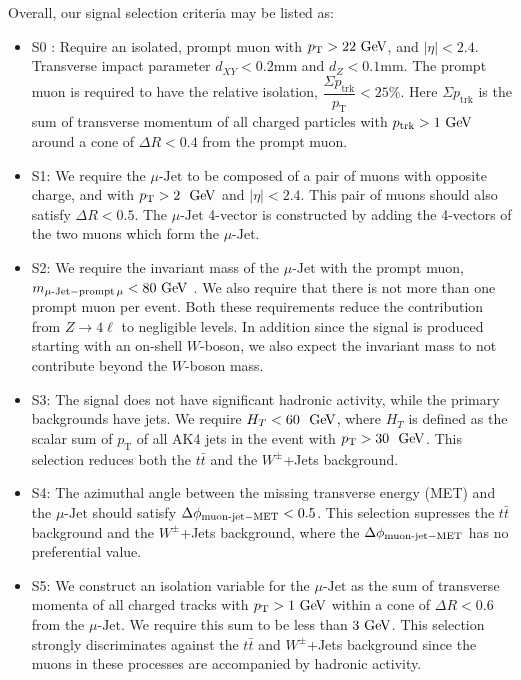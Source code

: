 \documentclass[reprint,doublecolumn,secnumarabic,amssymb, amsmath, aps,nofootinbib,superscriptaddress]{revtex4-1}
\def\GeV{\ifmmode {\mathrm{\ Ge\kern -0.1em V}}\else
                   \textrm{Ge\kern -0.1em V}\fi}%
\newcommand{\pt}      {\ensuremath{p_{\mathrm{T}}}}
\def\abseta{\ensuremath{|\eta|}}
\newcommand{\ttbar}{\ensuremath{t\bar{t}}}
\begin{document}
Overall, our signal selection criteria may be listed as:
\begin{itemize}
\item S0 : Require an isolated, prompt muon with $\pt> 22\GeV$, and $\abseta < 2.4$. Transverse impact parameter $d_{XY} < 0.2$mm and $d_{Z} < 0.1$mm.
The prompt muon is required to have the relative isolation, $\dfrac{\Sigma p_{\mathrm{trk}}}{\pt} < 25\%$. Here $\Sigma p_{\mathrm{trk}}$ is the sum of transverse momentum of all charged particles with $p_{\mathrm{trk}}> 1\GeV$ around a cone of $\Delta R < 0.4$ from the prompt muon.

\item S1: We require the $\mu\text{-Jet}$ to be composed of a pair of muons with opposite charge, and with $\pt>2~\GeV$ and $\abseta<2.4$. This pair of muons should also satisfy $\Delta R < 0.5$. The $\mu\text{-Jet}$ 4-vector is constructed by adding the 4-vectors of the two muons which form the $\mu\text{-Jet}$.
\item S2: We require the invariant mass of the $\mu\text{-Jet}$ with the prompt muon, $m_{\mu\text{-Jet}-\rm{prompt\,}\mu } < 80 \GeV$ . We also require that there is not more than one prompt muon per event. Both these requirements reduce the contribution from $Z\rightarrow 4\ell$ to negligible levels. In addition since the signal is produced starting with an on-shell $W$-boson, we also expect the invariant mass to not contribute beyond the $W$-boson mass.
\item S3: The signal does not have significant hadronic activity, while the primary backgrounds have jets. We require $H_{T}<60~\GeV$, where $H_T$ is defined as the scalar sum of $\pt$ of all AK4 jets in the event with
$\pt>30~\GeV$. This selection reduces both the $\ttbar$ and the $W^\pm$+Jets background.
\item S4: The azimuthal angle between the missing transverse energy (MET) and the $\mu\text{-Jet}$ should satisfy $\Delta \phi_{\rm{\text{muon-jet}}-\rm{MET}} < 0.5$. This selection supresses the $\ttbar$ background and the $W^\pm$+Jets background, where the $\Delta \phi_{\rm{\text{muon-jet}}-\rm{MET}}$ has no preferential value.
\item S5: We construct an isolation variable for the $\mu\text{-Jet}$ as the sum of transverse momenta of all charged tracks with $\pt>1\GeV$ within a cone of $\Delta R < 0.6$ from the $\mu\text{-Jet}$. We require this sum
to be less than $3\GeV$. This selection strongly discriminates against the $\ttbar$ and $W^\pm$+Jets background since the muons in these processes are accompanied by hadronic activity.
\end{itemize}
	
\end{document}

